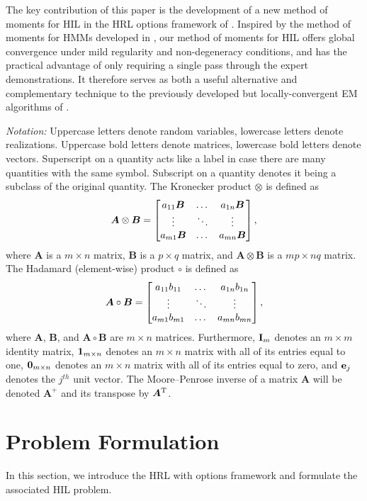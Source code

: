 The key contribution of this paper is the development of a new method of moments for HIL in the HRL options framework of \citep{SUTTON1999181}. Inspired by the method of moments for HMMs developed in \citep{hsu08}, our method of moments for HIL offers global convergence under mild regularity and non-degeneracy conditions, and has the practical advantage of only requiring a single pass through the expert demonstrations.
It therefore serves as both a useful alternative and complementary technique to the previously developed but locally-convergent EM algorithms of \citep{Daniel2016,Giammarino_2021, zhiyu20}.

\emph{Notation:}
Uppercase letters denote random variables, lowercase letters denote realizations. Uppercase bold letters denote matrices, lowercase bold letters denote vectors. Superscript on a quantity acts like a label in case there are many quantities with the same symbol. Subscript on a quantity denotes it being a subclass of the original quantity.
The Kronecker product $\otimes$ is defined as
\[
    \bm{A}\otimes \bm{B}=\bmat{a_{11}\bm{B}&\dots&a_{1n}\bm{B}\\ \vdots&\ddots&\vdots\\ a_{m1}\bm{B}&\dots&a_{mn}\bm{B}},
\]
where $\bm A$ is a $m\times n$ matrix, $\bm B$ is a $p\times q$ matrix, 
and $\bm{A}\otimes \bm{B}$ is a $mp\times nq$ matrix.
The Hadamard (element-wise) product $\circ$ is defined as
\[
    \bm{A}\circ \bm{B}=\bmat{a_{11}b_{11}&\dots&a_{1n}b_{1n}\\ \vdots&\ddots&\vdots\\
    a_{m1}b_{m1}&\dots&a_{mn}b_{mn}},
\]
where $\bm A$, $\bm B$, and $\bm{A}\circ \bm{B}$ are $m\times n$ matrices.
Furthermore, $\mathbf{I}_m$ denotes an $m\times m$ identity matrix, 
$\bm{\mathrm{1}}_{m\times n}$ denotes an $m\times n$ matrix with all of its entries equal to one, $\bm{\mathrm{0}}_{m\times n}$ denotes an $m\times n$ matrix with all of its entries equal to zero, and $\bm{\mathrm{e}}_j$ denotes the $j^{th}$ unit vector.
The Moore–Penrose inverse of a matrix $\bm A$ will be denoted $\bm A^+$ and its transpose by ${\bm A}^{\mathrm{T}}$.

\section{Problem Formulation}
\label{sec:problem}

In this section, we introduce the HRL with \citep{Bauer:2007}options framework \citep{SUTTON1999181,Barto2003} and formulate the associated HIL problem.

